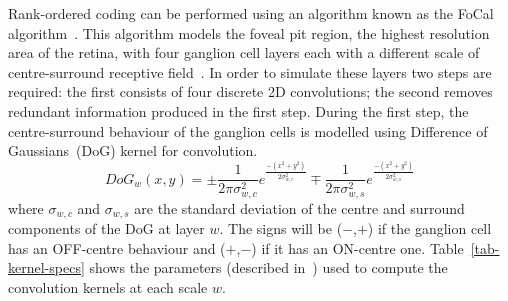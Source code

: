 \documentclass{frontiersENG} %
\begin{document}
Rank-ordered coding can be performed using an algorithm known as the
{FoCal algorithm~\citep{sen2009evaluating}}.
This algorithm models the foveal pit region, the highest resolution area of the retina, with four ganglion cell layers each with a different scale of centre-surround receptive field~\citep{kolb2003retina}. In order to simulate these layers two steps are required: the first consists of four discrete 2D convolutions; the second removes redundant information produced in the first step. During the first step, the centre-surround behaviour of the ganglion cells is modelled using Difference of Gaussians~(DoG) kernel for convolution. 
\begin{equation}
\label{eq-dog}
DoG_w(x,y) = \pm\frac{1}{2\pi\sigma_{w,c}^2}e^{\frac{-(x^2 + y^2)}{2\sigma_{w,c}^2}}
\mp\frac{1}{2\pi\sigma_{w,s}^2}e^{\frac{-(x^2 + y^2)}{2\sigma_{w,s}^2}}
\end{equation}
where $\sigma_{w,c}$ and $\sigma_{w,s}$ are the standard deviation of the 
centre and surround components of the DoG at layer $w$. The signs 
will be ($-$,$+$) if the ganglion cell has an OFF-centre behaviour and 
($+$,$-$) if it has an ON-centre one. Table~\ref{tab-kernel-specs} 
shows the parameters (described in~\citealp{sen2009evaluating}) used to compute the convolution kernels at each 
scale $w$.
\end{document}
